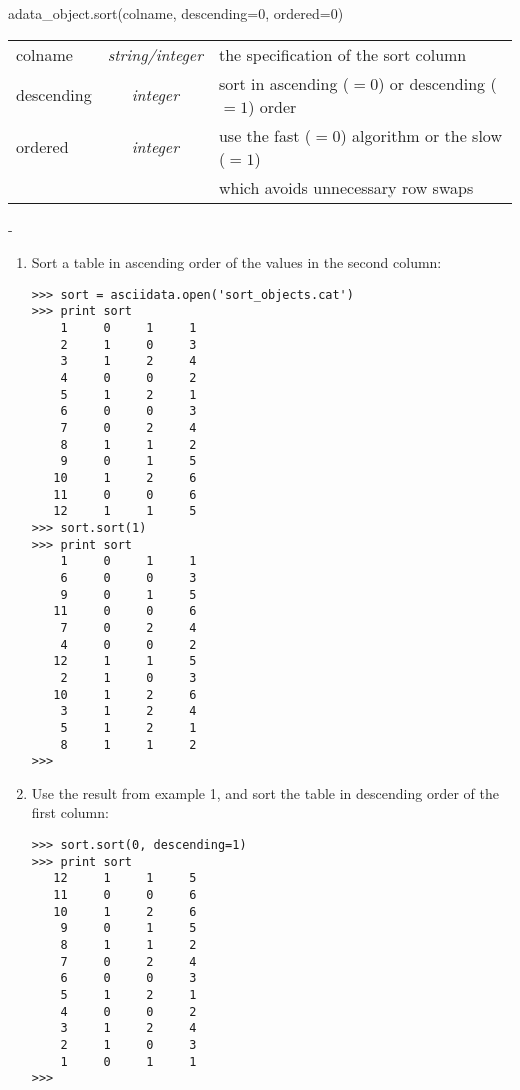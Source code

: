 adata\_object.sort(colname, descending=0, ordered=0)

\begin{tabular}{lcl}
colname & {\it string/integer} & the specification of the sort column\\
descending & {\it integer} & sort in ascending ($=0$) or descending ($=1$) order\\
ordered & {\it integer} & use the fast ($=0$) algorithm or the slow ($=1$)\\
        &               & which avoids unnecessary row swaps\\
\end{tabular}

-

\begin{enumerate}
\item Sort a table in ascending order of the values in the second column:
\begin{small}
\begin{verbatim}
>>> sort = asciidata.open('sort_objects.cat')
>>> print sort
    1     0     1     1
    2     1     0     3
    3     1     2     4
    4     0     0     2
    5     1     2     1
    6     0     0     3
    7     0     2     4
    8     1     1     2
    9     0     1     5
   10     1     2     6
   11     0     0     6
   12     1     1     5
>>> sort.sort(1)
>>> print sort
    1     0     1     1
    6     0     0     3
    9     0     1     5
   11     0     0     6
    7     0     2     4
    4     0     0     2
   12     1     1     5
    2     1     0     3
   10     1     2     6
    3     1     2     4
    5     1     2     1
    8     1     1     2
>>>
\end{verbatim}
\end{small}

\item Use the result from example 1, and sort the table in descending
order of the first column:
\begin{small}
\begin{verbatim}
>>> sort.sort(0, descending=1)
>>> print sort
   12     1     1     5
   11     0     0     6
   10     1     2     6
    9     0     1     5
    8     1     1     2
    7     0     2     4
    6     0     0     3
    5     1     2     1
    4     0     0     2
    3     1     2     4
    2     1     0     3
    1     0     1     1
>>>
\end{verbatim}
\end{small}


\end{enumerate}
